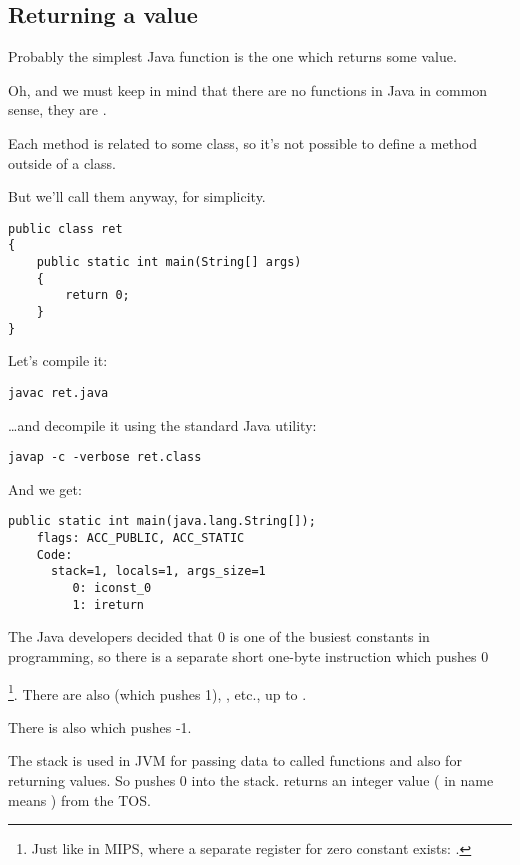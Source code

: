 \subsection{Returning a value}

Probably the simplest Java function is the one which returns some value.

Oh, and we must keep in mind that there are no  functions in Java in common sense,
they are . 

Each method is related to some class, so it's not possible to define
a method outside of a class.

But we'll call them  anyway, for simplicity.

\begin{lstlisting}[style=customjava]
public class ret
{
	public static int main(String[] args) 
	{
		return 0;
	}
}
\end{lstlisting}

Let's compile it:

\begin{lstlisting}
javac ret.java
\end{lstlisting}

\dots and decompile it using the standard Java utility:

\begin{lstlisting}
javap -c -verbose ret.class
\end{lstlisting}

And we get:

\begin{lstlisting}[caption=JDK 1.7 (excerpt)]
  public static int main(java.lang.String[]);
    flags: ACC_PUBLIC, ACC_STATIC
    Code:
      stack=1, locals=1, args_size=1
         0: iconst_0      
         1: ireturn       
\end{lstlisting}

The Java developers decided that 0 is one of the busiest constants in programming, 
so there is a separate short one-byte  instruction which pushes 0

\footnote{Just like in MIPS, where a separate register for zero constant exists: .}.
There are also  (which pushes 1), , etc., up to .

There is also  which pushes -1.

The stack is used in JVM for passing data to called functions and also for returning values.
So  pushes 0 into the stack.
 returns an integer value ( in name means ) from the \ac{TOS}.

